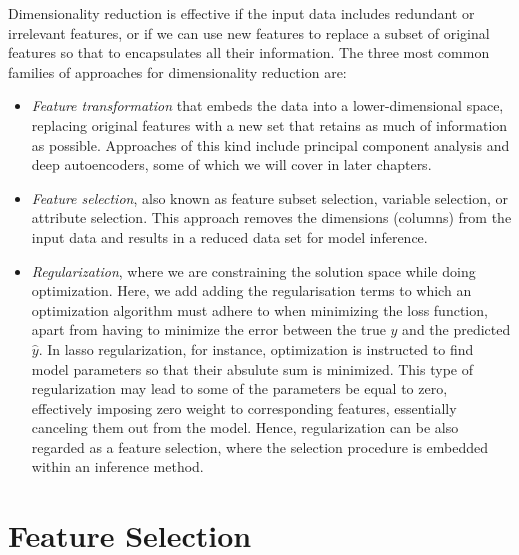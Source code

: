 \begin{refsection}
Dimensionality reduction is effective if the input data includes redundant or irrelevant features, or if we can use new features to replace a subset of original features so that to encapsulates all their information. The three most common families of approaches for dimensionality reduction are:
\begin{itemize}
\item {\em Feature transformation} that embeds the data into a lower-dimensional space, replacing original features with a new set that retains as much of information as possible. Approaches of this kind include principal component analysis and deep autoencoders, some of which we will cover in later chapters.
\item {\em Feature selection}, also known as feature subset selection, variable selection, or attribute selection. This approach removes the dimensions (\eg columns) from the input data and results in a reduced data set for model inference.
\item {\em Regularization}, where we are constraining the solution space while doing optimization. Here, we add adding the regularisation terms to which an optimization algorithm must adhere to when minimizing the loss function, apart from having to minimize the error between the true $y$ and the predicted $\hat{y}$. In lasso regularization, for instance, optimization is instructed to find model parameters so that their absulute sum is minimized. This type of regularization may lead to some of the parameters be equal to zero, effectively imposing zero weight to corresponding features, essentially canceling them out from the model. Hence, regularization can be also regarded as a feature selection, where the selection procedure is embedded within an inference method.
\end{itemize}


\section{Feature Selection}



\end{refsection}
